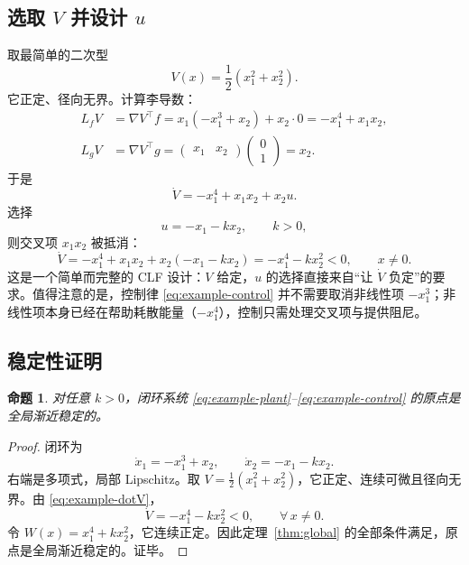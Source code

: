 \documentclass[11pt, a4paper, UTF8, fontset=none]{ctexart}
\theoremstyle{cnthm}
\newtheorem{proposition}[theorem]{命题}
\newcommand{\Lf}{L_f}
\newcommand{\Lg}{L_g}
\begin{document}
\subsection{选取 \texorpdfstring{$V$}{V} 并设计 \texorpdfstring{$u$}{u}}

取最简单的二次型
\begin{equation}
  V(x)=\frac12\left(x_1^2+x_2^2\right).
\end{equation}
它正定、径向无界。计算李导数：
\begin{align}
  \Lf V&=\nabla V^\top f
  =x_1(-x_1^3+x_2)+x_2\cdot0=-x_1^4+x_1x_2,\\
  \Lg V&=\nabla V^\top g
  =\begin{pmatrix}x_1&x_2\end{pmatrix}\begin{pmatrix}0\\1\end{pmatrix}=x_2.
\end{align}
于是
\begin{equation}
  \dot V=-x_1^4+x_1x_2+x_2u.
\end{equation}
选择
\begin{equation}
  u=-x_1-kx_2,\qquad k>0,
  \label{eq:example-control}
\end{equation}
则交叉项 $x_1x_2$ 被抵消：
\begin{equation}
  \dot V=-x_1^4+x_1x_2+x_2(-x_1-kx_2)
  =-x_1^4-kx_2^2<0,\qquad x\ne0.
  \label{eq:example-dotV}
\end{equation}
这是一个简单而完整的 CLF 设计：$V$ 给定，$u$ 的选择直接来自“让 $\dot V$ 负定”的要求。值得注意的是，控制律 \eqref{eq:example-control} 并不需要取消非线性项 $-x_1^3$；非线性项本身已经在帮助耗散能量（$-x_1^4$），控制只需处理交叉项与提供阻尼。

\subsection{稳定性证明}

\begin{proposition}
对任意 $k>0$，闭环系统 \eqref{eq:example-plant}--\eqref{eq:example-control} 的原点是全局渐近稳定的。
\end{proposition}

\begin{proof}
闭环为
\begin{equation}
  \dot x_1=-x_1^3+x_2,\qquad \dot x_2=-x_1-kx_2.
  \label{eq:example-closed}
\end{equation}
右端是多项式，局部 Lipschitz。取 $V=\frac12(x_1^2+x_2^2)$，它正定、连续可微且径向无界。由 \eqref{eq:example-dotV}，
\begin{equation}
  \dot V=-x_1^4-kx_2^2<0,\qquad \forall\,x\ne0.
\end{equation}
令 $W(x)=x_1^4+kx_2^2$，它连续正定。因此定理~\ref{thm:global} 的全部条件满足，原点是全局渐近稳定的。证毕。
\end{proof}
\end{document}
